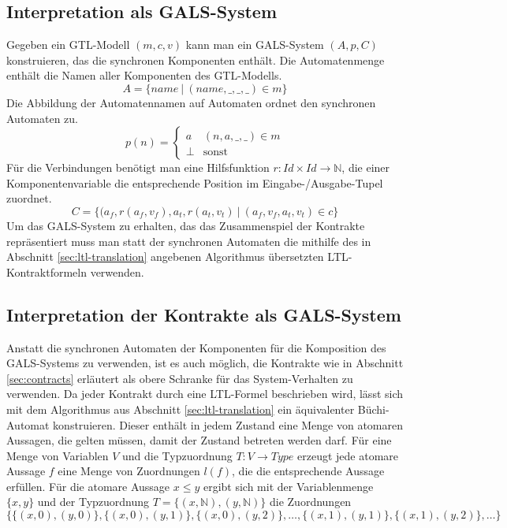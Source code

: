 \subsection{Interpretation als GALS-System}
Gegeben ein GTL-Modell $(m,c,v)$ kann man ein GALS-System $(A,p,C)$ konstruieren, das die synchronen Komponenten enthält.
Die Automatenmenge enthält die Namen aller Komponenten des GTL-Modells.
\[ A = \{ \mathit{name}\ |\ (\mathit{name},\_,\_,\_)\in m \} \]
Die Abbildung der Automatennamen auf Automaten ordnet den synchronen Automaten zu.
\[ p(n) = \left\{\begin{array}{lr}
    a & (n,a,\_,\_)\in m\\
    \bot & \textrm{sonst}
  \end{array}\right. \]
Für die Verbindungen benötigt man eine Hilfsfunktion $r : \mathit{Id}\times\mathit{Id}\rightarrow \mathbb{N}$, die einer Komponentenvariable die entsprechende Position im Eingabe-/Ausgabe-Tupel zuordnet.
\[ C = \{(a_f,r(a_f,v_f),a_t,r(a_t,v_t)\ |\ (a_f,v_f,a_t,v_t)\in c\} \]
Um das GALS-System zu erhalten, das das Zusammenspiel der Kontrakte repräsentiert muss man statt der synchronen Automaten die mithilfe des in Abschnitt \ref{sec:ltl-translation} angebenen Algorithmus übersetzten LTL-Kontraktformeln verwenden.
\subsection{Interpretation der Kontrakte als GALS-System}
Anstatt die synchronen Automaten der Komponenten für die Komposition des GALS-Systems zu verwenden, ist es auch möglich, die Kontrakte wie in Abschnitt \ref{sec:contracts} erläutert als obere Schranke für das System-Verhalten zu verwenden.
Da jeder Kontrakt durch eine LTL-Formel beschrieben wird, lässt sich mit dem Algorithmus aus Abschnitt \ref{sec:ltl-translation} ein äquivalenter Büchi-Automat konstruieren.
Dieser enthält in jedem Zustand eine Menge von atomaren Aussagen, die gelten müssen, damit der Zustand betreten werden darf.
Für eine Menge von Variablen $V$ und die Typzuordnung $T : V\rightarrow \mathit{Type}$ erzeugt jede atomare Aussage $f$ eine Menge von Zuordnungen $l(f)$, die die entsprechende Aussage erfüllen.
Für die atomare Aussage $x\leq y$ ergibt sich mit der Variablenmenge $\{x,y\}$ und der Typzuordnung $T = \{ (x,\mathbb{N}),(y,\mathbb{N}) \}$ die Zuordnungen
\[ \{ \{ (x,0), (y,0) \}, \{ (x,0), (y,1) \}, \{ (x,0), (y,2) \},\dots,\{ (x,1), (y,1) \}, \{ (x,1), (y,2) \},\dots \} \]

